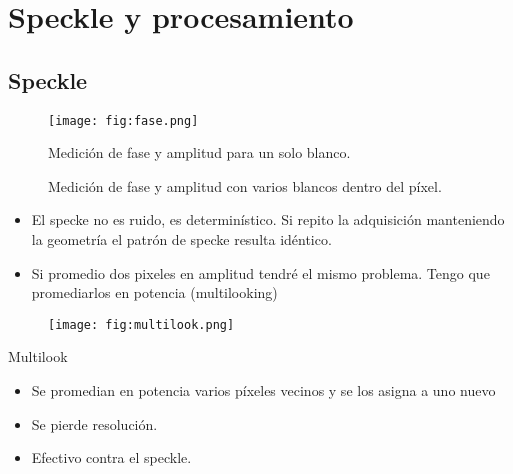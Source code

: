 \section{Speckle y procesamiento}

\subsection{Speckle}

\begin{frame}{} \vskip0cm
  \begin{figure}
    \centering
    \texttt{[image: fig:fase.png]}
    \caption{Medición de fase y amplitud para un solo blanco.}
    \label{}
  \end{figure}
\end{frame}

\begin{frame}{} \vskip0cm
  \begin{figure}
    \centering
    \caption{Medición de fase y amplitud con varios blancos dentro del píxel.}
    \label{}
  \end{figure}
\end{frame}


\begin{frame}{} \vskip0cm
  \begin{itemize}
    \item El specke no es ruido, es determinístico. Si repito la adquisición manteniendo la geometría el patrón de specke resulta idéntico.
    \item Si promedio dos pixeles en amplitud tendré el mismo problema. Tengo que promediarlos en potencia (multilooking)
  \end{itemize}
      \begin{figure}
        \centering
        \texttt{[image: fig:multilook.png]}
        \label{}
      \end{figure}

\end{frame}


\begin{frame}{} \vskip0cm

   \begin{block}{Multilook}
     \begin{itemize}
       \item Se promedian en potencia varios píxeles vecinos y se los asigna a uno nuevo
       \item Se pierde resolución.
       \item Efectivo contra el speckle.
     \end{itemize}
   \end{block}

\end{frame}


